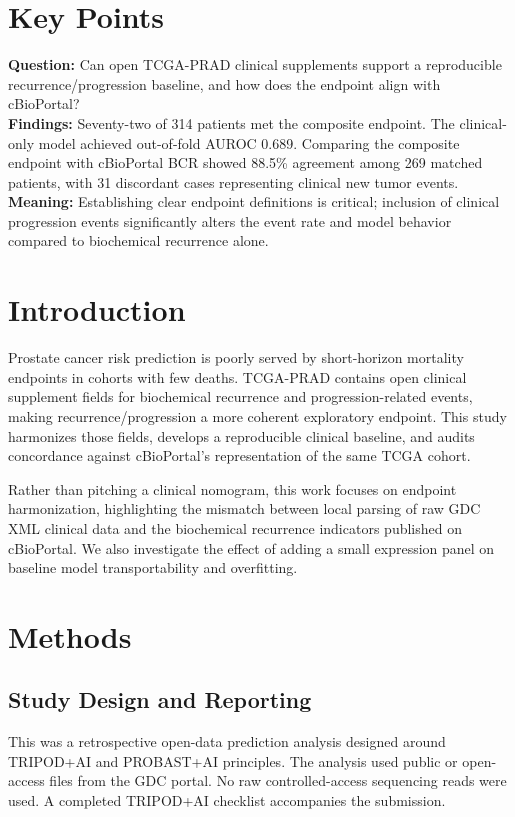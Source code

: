 \documentclass[11pt]{article}
\begin{document}
\section*{Key Points}
\textbf{Question:} Can open TCGA-PRAD clinical supplements support a reproducible recurrence/progression baseline, and how does the endpoint align with cBioPortal?\\
\textbf{Findings:} Seventy-two of 314 patients met the composite endpoint. The clinical-only model achieved out-of-fold AUROC 0.689. Comparing the composite endpoint with cBioPortal BCR showed 88.5\% agreement among 269 matched patients, with 31 discordant cases representing clinical new tumor events.\\
\textbf{Meaning:} Establishing clear endpoint definitions is critical; inclusion of clinical progression events significantly alters the event rate and model behavior compared to biochemical recurrence alone.

\section{Introduction}
Prostate cancer risk prediction is poorly served by short-horizon mortality endpoints in cohorts with few deaths. TCGA-PRAD contains open clinical supplement fields for biochemical recurrence and progression-related events, making recurrence/progression a more coherent exploratory endpoint. This study harmonizes those fields, develops a reproducible clinical baseline, and audits concordance against cBioPortal's representation of the same TCGA cohort.

Rather than pitching a clinical nomogram, this work focuses on endpoint harmonization, highlighting the mismatch between local parsing of raw GDC XML clinical data and the biochemical recurrence indicators published on cBioPortal. We also investigate the effect of adding a small expression panel on baseline model transportability and overfitting.

\section{Methods}
\subsection{Study Design and Reporting}
This was a retrospective open-data prediction analysis designed around TRIPOD+AI and PROBAST+AI principles. The analysis used public or open-access files from the GDC portal. No raw controlled-access sequencing reads were used. A completed TRIPOD+AI checklist accompanies the submission.
\end{document}
